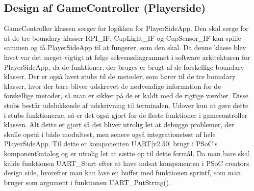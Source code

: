 \documentclass[Softwaredesign/Softwaredesign_main.tex]{subfiles}
\begin{document}
\subsection{Design af GameController (Playerside)}\label{sec:GameController_design_bilag}
GameController klassen sørger for logikken for PlayerSideApp. Den skal sørge for at de tre boundary klasser RPI\_IF, CupLight\_IF og CupSensor\_IF kan spille sammen og få PlayerSideApp til at fungerer, som den skal. Da denne klasse blev lavet var det meget vigtigt at følge sekvensdiagrammet i software arkitekturen for PlayerSideApp, da de funktioner, der bruges er brugt af de forskellige boundary klasser. Der er også lavet stubs til de metoder, som hører til de tre boundary klasser, hvor der bare bliver udskrevet de nødvendige information for de forskellige metoder, så man er sikker på de er kaldt med de rigtige værdier. Disse stubs består udelukkende af udskrivning til terminalen. Udover kun at gøre dette i stubs funktionerne, så er det også gjort for de fleste funktioner i gamecontroller klassen. Alt dette er gjort så det bliver utrolig let at debugge problemer, der skulle opstå i både modultest, men senere også integrationstest af hele PlayerSideApp. Til dette er komponenten UART[v2.50] brugt i PSoC's komponentkatalog og er utrolig let at sætte op til dette formål. Da man bare skal kalde funktionen UART\_Start efter at have indsat komponenten i PSoC creators design side, hvorefter man kan lave en buffer med funktionen sprintf, som man bruger som argument i funktionen UART\_PutString(). 
\end{document}
